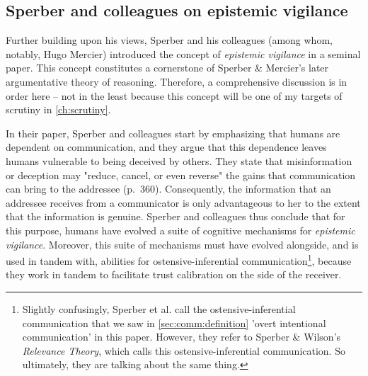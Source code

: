 \subsection{Sperber and colleagues on epistemic vigilance}
\label{sec:Sperber10}

Further building upon his \citeyear{Sperber01} views, Sperber and his colleagues (among whom, notably, Hugo Mercier) introduced the concept of \emph{epistemic vigilance} in a seminal \citeyear{Sperber10} paper. This concept constitutes a cornerstone of Sperber \& Mercier's later argumentative theory of reasoning. Therefore, a comprehensive discussion is in order here -- not in the least because this concept will be one of my targets of scrutiny in \cref{ch:scrutiny}.

In their \citeyear{Sperber10} paper, Sperber and colleagues start by emphasizing that humans are dependent on communication, and they argue that this dependence leaves humans vulnerable to being deceived by others.
They state that misinformation or deception may "reduce, cancel, or even reverse" the gains that communication can bring to the addressee (p.~360).
Consequently, the information that an addressee receives from a communicator is only advantageous to her to the extent that the information is genuine.
Sperber and colleagues thus conclude that for this purpose, humans have evolved a suite of cognitive mechanisms for \emph{epistemic vigilance}.
Moreover, this suite of mechanisms must have evolved alongside, and is used in tandem with, abilities for ostensive-inferential communication\footnote{Slightly confusingly, Sperber et al. call the ostensive-inferential communication that we saw in \cref{sec:comm:definition} 'overt intentional communication' in this paper. However, they refer to Sperber \& Wilson's \emph{Relevance Theory}, which calls this ostensive-inferential communication. So ultimately, they are talking about the same thing.}, because they work in tandem to facilitate trust calibration on the side of the receiver.

